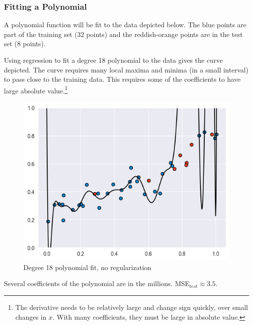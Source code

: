\documentclass[smaller]{beamer}
\theoremstyle{example}
\begin{document}
\begin{frame}
    \frametitle{Fitting a Polynomial}
    \renewcommand\thefootnote{\textcolor{black}{\arabic{footnote}}}
    A polynomial function will be fit to the data depicted below. The blue points are part of the training set (32 points) and the reddish-orange points are in the test set (8 points).
    
    Using regression to fit a degree 18 polynomial to the data gives the curve depicted. The curve requires many local maxima and minima (in a small interval) to pass close to the training data. This requires some of the coefficients to have large absolute value.\footnote{The derivative needs to be relatively large and change sign quickly, over small changes in $x$. With many coefficients, they must be large in absolute value.}
    
    \begin{figure}
        \begin{center}
            \includegraphics[height=0.30\textheight]{../../Images/data_polynomial18_fit.png}
        \end{center}
        \caption{Degree 18 polynomial fit, no regularization}
    \end{figure}
    Several coefficients of the polynomial are in the millions. MSE$_{test}\approx 3.5$.
\end{frame}
\end{document}
